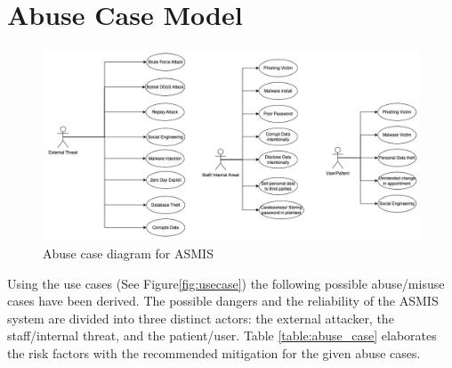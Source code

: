 \section{Abuse Case Model}

\begin{figure}[h!]
\centering
\includegraphics[width=\textwidth]{pics/abusecase.png}
\caption{Abuse case diagram for ASMIS}\label{fig:abuse_case}
\end{figure}

Using %
the use cases (See Figure\ref{fig:usecase}) the following possible abuse/misuse cases have been derived.
The possible dangers and the reliability of the ASMIS system are divided into three distinct actors: the external attacker, the staff/internal threat, and the patient/user. Table \ref{table:abuse_case} elaborates the risk factors with the recommended mitigation for the given abuse cases.

